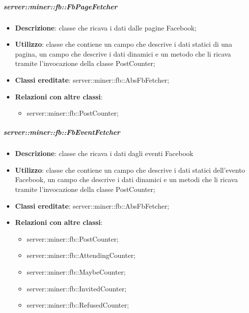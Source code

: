 		\subparagraph{server::miner::fb::FbPageFetcher} %
		\label{subp:server_miner_fb_FbPageFetcher}
			\begin{itemize}
				\item \textbf{Descrizione}: classe che ricava i dati dalle pagine Facebook;
				\item \textbf{Utilizzo}: classe che contiene un campo che descrive i dati statici di una pagina, un campo che descrive i dati dinamici e un metodo che li ricava tramite l'invocazione della classe PostCounter;
				\item \textbf{Classi ereditate}: server::miner::fb::AbsFbFetcher;
				\item \textbf{Relazioni con altre classi}:
					\begin{itemize}
						\item server::miner::fb::PostCounter;
					\end{itemize}
			\end{itemize}

		\subparagraph{server::miner::fb::FbEventFetcher} %
		\label{subp:server_miner_fb_FbEventFetcher}
			\begin{itemize}
				\item \textbf{Descrizione}: classe che ricava i dati dagli eventi Facebook
				\item \textbf{Utilizzo}: classe che contiene un campo che descrive i dati statici dell'evento Facebook, un campo che descrive i dati dinamici e un metodi che li ricava tramite l'invocazione della classe PostCounter;
				\item \textbf{Classi ereditate}: server::miner::fb::AbsFbFetcher;
				\item \textbf{Relazioni con altre classi}:
					\begin{itemize}
						\item server::miner::fb::PostCounter;
						\item server::miner::fb::AttendingCounter;
						\item server::miner::fb::MaybeCounter;
						\item server::miner::fb::InvitedCounter;
						\item server::miner::fb::RefusedCounter;
					\end{itemize}
			\end{itemize}


